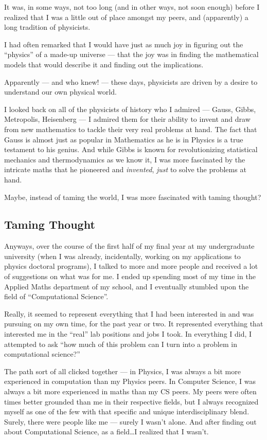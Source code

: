 \documentclass[]{article}
\begin{document}
It was, in some ways, not too long (and in other ways, not soon enough) before I
realized that I was a little out of place amongst my peers, and (apparently) a
long tradition of physicists.

I had often remarked that I would have just as much joy in figuring out the
``physics'' of a made-up universe --- that the joy was in finding the
mathematical models that would describe it and finding out the implications.

Apparently --- and who knew! --- these days, physicists are driven by a desire
to understand our own physical world.

I looked back on all of the physicists of history who I admired --- Gauss,
Gibbs, Metropolis, Heisenberg --- I admired them for their ability to invent and
draw from new mathematics to tackle their very real problems at hand. The fact
that Gauss is almost just as popular in Mathematics as he is in Physics is a
true testament to his genius. And while Gibbs is known for revolutionizing
statistical mechanics and thermodynamics as we know it, I was more fascinated by
the intricate maths that he pioneered and \emph{invented}, \emph{just} to solve
the problems at hand.

Maybe, instead of taming the world, I was more fascinated with taming thought?

\subsection{Taming Thought}\label{taming-thought}

Anyways, over the course of the first half of my final year at my undergraduate
university (when I was already, incidentally, working on my applications to
physics doctoral programs), I talked to more and more people and received a lot
of suggestions on what was for me. I ended up spending most of my time in the
Applied Maths department of my school, and I eventually stumbled upon the field
of ``Computational Science''.

Really, it seemed to represent everything that I had been interested in and was
pursuing on my own time, for the past year or two. It represented everything
that interested me in the ``real'' lab positions and jobs I took. In everything
I did, I attempted to ask ``how much of this problem can I turn into a problem
in computational science?''

The path sort of all clicked together --- in Physics, I was always a bit more
experienced in computation than my Physics peers. In Computer Science, I was
always a bit more experienced in maths than my CS peers. My peers were often
times better grounded than me in their respective fields, but I always
recognized myself as one of the few with that specific and unique
interdisciplinary blend. Surely, there were people like me --- surely I wasn't
alone. And after finding out about Computational Science, as a field\ldots{}I
realized that I wasn't.
\end{document}
